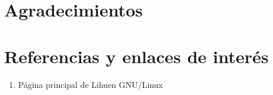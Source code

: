 \documentclass[final,narroweqnarray,inline,twoside]{ieee}
\begin{document}
\section{Agradecimientos}

\section{Referencias y enlaces de interés}
\begin{enumerate}
\item Página principal de Lihuen GNU/Linux\\
\\[Visitado el día 9 de enero de 2009]
\end{enumerate}
\end{document}

